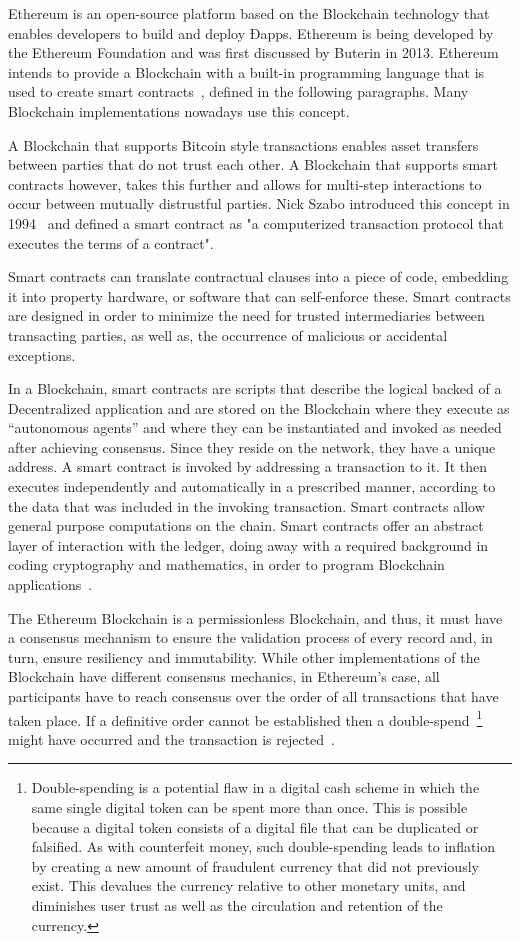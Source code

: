 Ethereum is an open-source platform based on the Blockchain technology that
enables developers to build and deploy Ðapps. Ethereum is being developed by
the Ethereum Foundation and was first discussed by Buterin in 2013. Ethereum
intends to provide a Blockchain with a built-in programming language that is
used to create smart contracts~\cite{Wood2017}, defined in the following
paragraphs.  Many Blockchain implementations nowadays use this concept.

A Blockchain that supports Bitcoin style transactions enables asset transfers
between parties that do not trust each other. A Blockchain that supports smart
contracts however, takes this further and allows for multi-step interactions to
occur between mutually distrustful parties. Nick Szabo introduced this concept
in 1994~\cite{Christidis2016} and defined a smart contract as "a computerized
transaction protocol that executes the terms of a contract". 

Smart contracts can translate contractual clauses into a piece of code,
embedding it into property hardware, or software that can self-enforce these.
Smart contracts are designed in order to minimize the need for trusted
intermediaries between transacting parties, as well as, the occurrence of
malicious or accidental exceptions.

 In a Blockchain, smart contracts are scripts that describe the logical backed
 of a Decentralized application and are stored on the Blockchain where they
 execute as “autonomous agents” and where they can be instantiated and invoked
 as needed after achieving consensus.  Since they reside on the network, they
 have a unique address. A smart contract is invoked by addressing a transaction
 to it.  It then executes independently and automatically in a prescribed
 manner, according to the data that was included in the invoking transaction.
 Smart contracts allow general purpose computations on the chain.  Smart
 contracts offer an abstract layer of interaction with the ledger, doing away
 with a required background in coding cryptography and mathematics, in order to
 program Blockchain applications~\cite{Wood2017,BlockGeeks2017}.

The Ethereum Blockchain is a permissionless Blockchain, and thus, it must have
a consensus mechanism to ensure the validation process of every record and, in
turn, ensure resiliency and immutability. While other implementations of the
Blockchain have different consensus mechanics, in Ethereum’s case, all
participants have to reach consensus over the order of all transactions that
have taken place. If a definitive order cannot be established then a
double-spend~\footnote{Double-spending is a potential flaw in a digital cash
scheme in which the same single digital token can be spent more than once.
This is possible because a digital token consists of a digital file that can be
duplicated or falsified. As with counterfeit money, such double-spending leads
to inflation by creating a new amount of fraudulent currency that did not
previously exist. This devalues the currency relative to other monetary units,
and diminishes user trust as well as the circulation and retention of the
currency.} might have occurred and the transaction is rejected~\cite{Wood2017}.

